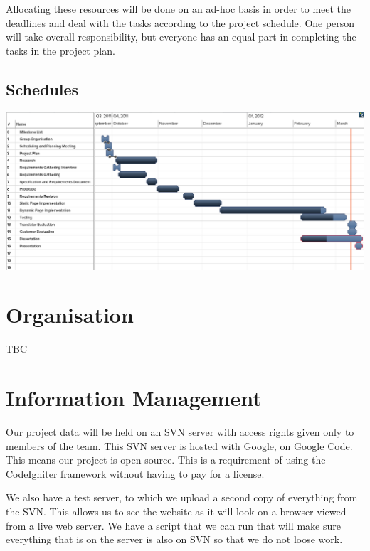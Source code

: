 \documentclass{l3proj}
\begin{document}
Allocating these resources will be done on an ad-hoc basis in order to meet the deadlines and deal with the tasks according to the project schedule.
One person will take overall responsibility, but everyone has an equal part in completing the tasks in the project plan.
\subsection{Schedules}
\includegraphics[scale=0.5, angle=90]{gantt}


\section{Organisation}
\label{sect:org}
TBC

\section{Information Management}
\label{sect:info-man}
Our project data will be held on an SVN server with access rights given only to
members of the team. This SVN server is hosted with Google, on Google Code. This
means our project is open source. This is a requirement of using the CodeIgniter
framework without having to pay for a license. 

We also have a test server, to which we upload a second copy of everything from
the SVN. This allows us to see the website as it will look on a browser viewed
from a live web server. We have a script that we can run that will make sure
everything that is on the server is also on SVN so that we do not loose work.
\end{document}
